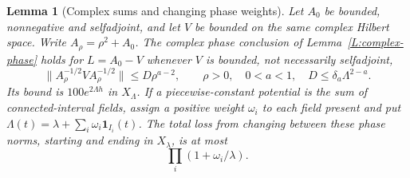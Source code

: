 \documentclass[12pt]{article}
\numberwithin{equation}{section}
\newtheorem{lemma}[theorem]{Lemma}
\theoremstyle{definition}
\begin{document}
\begin{lemma}[Complex sums and changing phase weights]
  \label{L:interval-complex}
  Let $A_0$ be bounded, nonnegative and selfadjoint, and let $V$ be bounded
  on the same complex Hilbert space. Write $A_\rho=\rho^2+A_0$.
  The complex phase conclusion of Lemma~\ref{L:complex-phase} holds
  for $L=A_0-V$ whenever $V$ is bounded, not necessarily selfadjoint,
  \[
    \|A_\rho^{-1/2}VA_\rho^{-1/2}\|\le D\rho^{a-2},\qquad \rho>0,
    \quad 0<a<1,\quad D\le\delta_a\Lambda^{2-a}.
  \]
  Its bound is $100e^{2\Lambda h}$ in $X_\Lambda$.
  If a piecewise-constant potential is the sum of connected-interval
  fields, assign a positive weight $\omega_i$ to each field present
  and put $\Lambda(t)=\lambda+\sum_i\omega_i\mathbf1_{I_i}(t)$.
  The total loss from changing between these phase norms, starting
  and ending in $X_\lambda$, is at most
  \begin{equation}\label{E:interval-metric}
    \prod_i(1+\omega_i/\lambda).
  \end{equation}
\end{lemma}
\end{document}
